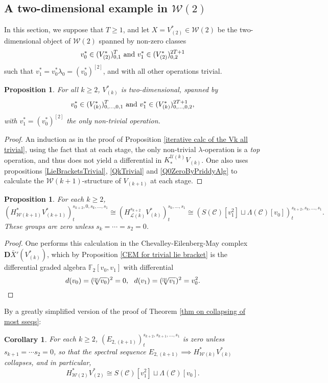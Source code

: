 \documentclass[11pt]{amsart} \renewcommand{\baselinestretch}{1.2}
\theoremstyle{plain}
\newtheorem{prop}[thm]{Proposition}
\newtheorem{cor}[thm]{Corollary}
\theoremstyle{definition}
\newcommand{\scrC}{\mathscr{C}}
\newcommand{\calU}{\mathcal{U}}
\newcommand{\calL}{\mathcal{L}}
\newcommand{\calw}{\mathcal{W}}
\newcommand{\CommOperad}{{\scrC}}
\newcommand{\restn}[1]{#1^{[2]}}
\newcommand{\dualrestn}[1]{\sqrt[{[2]}]{#1}}
\renewcommand{\dualrestn}[1]{\sqrt[{\!\!\![2]}]{#1}}
\newcommand{\UEAX}{\bar{X}'}%
\newcommand{\F}{\mathbb{F}}
\newcommand{\Ftwo}{\F_2}
\newcommand{\dual}{\mathbf{D}}
\begin{document}
\begin{Calculations of HWn}
\subsection{A two-dimensional example in $\calw(2)$}
In this section, we suppose that $T\geq1$, and let $X=V^*_{(2)}\in\calw(2)$ be the two-dimensional object of $\calw(2)$ spanned by non-zero classes 
\[v_{0}^{*}\in (V^*_{(2)})^{T}_{0,1}\textup{ and }v_{1}^{*}\in (V^*_{(2)})^{2T+1}_{0,2}\]
such that $v^*_{1}=v^*_0\lambda_{0}=\restn{(v^*_0)}$, and with all other operations trivial. 
\begin{prop}
\label{2d example in w2}
For all $k\geq2$, $V^*_{(k)}$ is two-dimensional, spanned by
\[v_{0}^{*}\in (V^*_{(k)})^{T}_{0,\ldots,0,1}\textup{ and }v_{1}^{*}\in (V^*_{(k)})^{2T+1}_{0,\ldots,0,2},\]
with  $v^*_{1}=\restn{(v^*_0)}$ the only non-trivial operation.
\end{prop}
\begin{proof}
An induction as in the proof of Proposition \ref{iterative calc of the Vk all trivial}, using the fact that at each stage, the only non-trivial $\lambda$-operation is a \emph{top} operation, and thus does not yield a differential in $K_*^{\calU(k)}V_{(k)}$. One also uses propositions \ref{LieBracketsTrivial}, \ref{QkTrivial} and \ref{Q0ZeroByPriddyAlg} to calculate the $\calw(k+1)$-structure of $V_{(k+1)}$ at each stage.
\end{proof}
\begin{prop}
For each $k\geq2$,
\[(H^*_{\calw(k+1)}V^*_{(k+1)})^{s_{k+2},0,s_k,\ldots,s_1}_{t}\cong (H^{s_{k+2}}_{\calL(k)}V^*_{(k)})^{s_k,\ldots,s_1}_t\cong (S(\CommOperad)[v_1^{2}]\sqcup \Lambda(\CommOperad)[v_0])_t^{s_{k+2},s_{k},\ldots,s_1}.\]
These groups are zero unless $s_k=\cdots =s_2=0$.
\end{prop}
\begin{proof}
One performs this calculation in the Chevalley-Eilenberg-May complex $\dual\UEAX(V^*_{(k)})$, which by Proposition \ref{CEM for trivial lie bracket} is the differential graded algebra $\Ftwo [v_0,v_1]$ with differential
\[d(v_0)=(\dualrestn{v_0})^2=0,\ \ d(v_1)=(\dualrestn{v_1})^2=v_0^2.\qedhere\]
\end{proof}
By a greatly simplified version of the proof of Theorem \ref{thm on collapsing of most sseqs}:
\begin{cor}
\label{statement of result on 2d w2 example}
For each $k\geq2$, $(E_{2,(k+1)})^{s_{k+2},s_{k+1},\ldots,s_1}_{t}$ is zero unless $s_{k+1}=\cdots s_2=0$, so that the spectral sequence $E_{2,(k+1)}\implies H^*_{\calw(k)}V^*_{(k)}$ collapses, and in particular,
\[H^*_{\calw(2)}V^*_{(2)}\cong S(\CommOperad) [v_1^{2}]\sqcup \Lambda(\CommOperad)[v_0].\]
\end{cor}


\end{Calculations of HWn}
\end{document}
